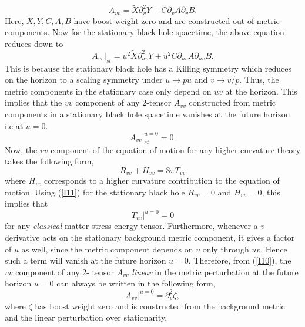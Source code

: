 \documentclass[12pt]{article}
\begin{document}
\begin{equation}\label{I10}
A_{vv}= \tilde X\partial_{v}^2 Y + C\partial_v A \partial_v B .
\end{equation}
Here,  $\tilde X,Y,C,A,B$ have boost weight zero and are constructed out of metric components. Now for the stationary black hole spacetime, the above equation reduces down to
\begin{equation}\label{I11}
A_{vv}|_{st}= u^2 \tilde X\partial_{uv}^2 Y + u^2 C\partial_{uv} A \partial_{uv} B .
\end{equation}
This is because the stationary black hole has a Killing symmetry which reduces on the horizon to a scaling symmetry under $u \to p u$ and $v \to v/p$. Thus, the metric components in the stationary case only depend on $uv$ at the horizon. This implies that the $vv$ component of any 2-tensor $A_{vv}$ constructed from metric components in a stationary black hole spacetime vanishes at the future horizon i.e at $u=0$.
\begin{equation}\label{I12}
A_{vv}|_{st}^{u=0}=0.
\end{equation}
Now, the $vv$ component of the equation of motion for any higher curvature theory takes the following form,
\begin{equation}\label{I13}
R_{vv} + H_{vv}= 8\pi T_{vv}
\end{equation}
where $H_{vv}$ corresponds to a higher curvature contribution to the equation of motion. Using (\ref{I11}) for the stationary black hole $R_{vv}=0$ and $H_{vv}=0$, this implies that
\begin{equation}\label{I14}
T_{vv}|^{u=0}=0
\end{equation}
for any \emph{classical} matter stress-energy tensor. Furthermore, whenever a $v$ derivative acts on the stationary background metric component, it gives a factor of $u$ as well, since the metric component depends on $v$ only through $uv$. Hence such a term will vanish at the future horizon $u=0$. Therefore, from (\ref{I10}), the $vv$ component of any 2- tensor $A_{vv}$ \emph{linear} in the metric perturbation at the future horizon $u=0$ can always be written in the following form,
\begin{equation}\label{I15}
A_{vv}|^{u=0}= \partial_{v}^2 \zeta ,
\end{equation}
where $\zeta$ has boost weight zero and is constructed from the background metric and the linear perturbation over stationarity.
\\
\end{document}
